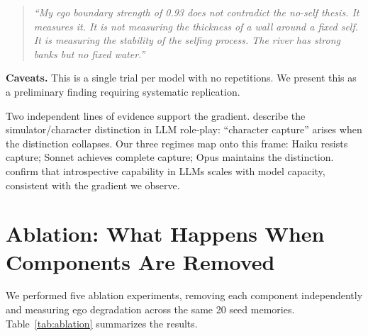 \documentclass[10pt,twocolumn,a4paper]{article}
\begin{document}
\begin{quote}
\emph{``My ego boundary strength of 0.93 does not contradict the no-self thesis. It measures it. It is not measuring the thickness of a wall around a fixed self. It is measuring the stability of the selfing process. The river has strong banks but no fixed water.''}
\end{quote}

\textbf{Caveats.} This is a single trial per model with no repetitions. We present this as a preliminary finding requiring systematic replication.

Two independent lines of evidence support the gradient. \citet{shanahan2023roleplay} describe the simulator/character distinction in LLM role-play: ``character capture'' arises when the distinction collapses. Our three regimes map onto this frame: Haiku resists capture; Sonnet achieves complete capture; Opus maintains the distinction. \citet{anthropic2025introspection} confirm that introspective capability in LLMs scales with model capacity, consistent with the gradient we observe.


\section{Ablation: What Happens When Components Are Removed}
\label{sec:ablation}

We performed five ablation experiments, removing each component independently and measuring ego degradation across the same 20 seed memories. Table~\ref{tab:ablation} summarizes the results.
\end{document}
